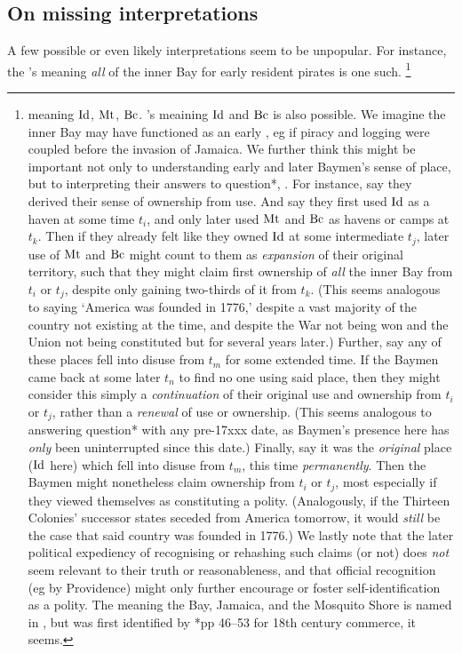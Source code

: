 	\subsection{On missing interpretations}
	\label{ss:onmissinginterpret}
		A few possible or even likely interpretations seem to be unpopular. For instance, the 's meaning \emph{all} of the inner Bay for early resident pirates is one such.%
		\footnote{ meaning \(\operatorname{Id}\), \(\operatorname{Mt}\), \(\operatorname{Bc}\). 's meaining \(\operatorname{Id}\) and \(\operatorname{Bc}\) is also possible. We imagine the inner Bay may have functioned as an early , eg if piracy and logging were coupled before the invasion of Jamaica. We further think this might be important not only to understanding early and later Baymen's sense of place, but to interpreting their answers to question*, . For instance, say they derived their sense of ownership from use. And say they first used \(\operatorname{Id}\) as a haven at some time \(t_i\), and only later used \(\operatorname{Mt}\) and \(\operatorname{Bc}\) as havens or camps at \(t_k\). Then if they already felt like they owned \(\operatorname{Id}\) at some intermediate \(t_j\), later use of \(\operatorname{Mt}\) and \(\operatorname{Bc}\) might count to them as \emph{expansion} of their original territory, such that they might claim first ownership of \emph{all} the inner Bay from \(t_i\) or \(t_j\), despite only gaining two-thirds of it from \(t_k\). (This seems analogous to saying `America was founded in 1776,' despite a vast majority of the country not existing at the time, and despite the War not being won and the Union not being constituted but for several years later.) Further, say any of these places fell into disuse from \(t_m\) for some extended time. If the Baymen came back at some later \(t_n\) to find no one using said place, then they might consider this simply a \emph{continuation} of their original use and ownership from \(t_i\) or \(t_j\), rather than a \emph{renewal} of use or ownership. (This seems analogous to answering question* with any pre-17xxx date, as Baymen's presence here has \emph{only} been uninterrupted since this date.) Finally, say it was the \emph{original} place (\(\operatorname{Id}\) here) which fell into disuse from \(t_m\), this time \emph{permanently}. Then the Baymen might nonetheless claim ownership from \(t_i\) or \(t_j\), most especially if they viewed themselves as constituting a polity. (Analogously, if the Thirteen Colonies' successor states seceded from America tomorrow, it would \emph{still} be the case that said country was founded in 1776.) We lastly note that the later political expediency of recognising or rehashing such claims (or not) does \emph{not} seem relevant to their truth or reasonableness, and that official recognition (eg by Providence) might only further encourage or foster self-identification as a polity. The  meaning the Bay, Jamaica, and the Mosquito Shore is named in , but was first identified by \cite{nay89}*{pp 46--53} for 18th century commerce, it seems.}
